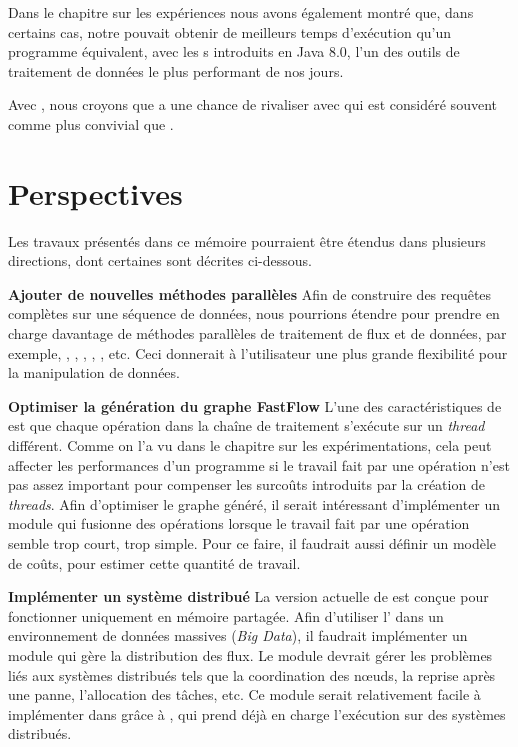 \begin{conclusion}
Dans le chapitre sur les exp\'eriences nous avons \'egalement montr\'e que, dans certains cas, notre  pouvait obtenir de meilleurs temps d'ex\'ecution qu'un programme  \'equivalent, avec les s introduits en Java 8.0, l'un des outils de traitement de donn\'ees le plus performant de nos jours.

Avec , nous croyons que  a une chance de rivaliser avec  qui est consid\'er\'e souvent comme plus convivial que . 


\section*{\textbf{Perspectives}}

Les travaux pr\'esent\'es dans ce m\'emoire pourraient \^etre \'etendus dans plusieurs directions, dont certaines sont d\'ecrites ci-dessous.

\textbf{Ajouter de nouvelles m\'ethodes parall\`eles} Afin de construire des requ\^etes compl\`etes sur une s\'equence de donn\'ees, nous pourrions \'etendre  pour prendre en charge davantage de m\'ethodes parall\`eles de traitement de flux et de donn\'ees, par exemple, , , , , , etc. Ceci donnerait \`a l'utilisateur une plus grande flexibilit\'e pour la manipulation de donn\'ees.

\textbf{Optimiser la génération du graphe FastFlow} L'une des caract\'eristiques de  est que chaque op\'eration dans la cha\^ine de traitement s'ex\'ecute sur un \emph{thread} diff\'erent. Comme on l'a vu dans le chapitre sur les expérimentations, cela peut affecter les performances d'un programme si le travail fait par une op\'eration n'est pas assez important pour compenser les surco\^uts introduits par la cr\'eation de \emph{threads}. Afin d'optimiser le graphe généré, il serait intéressant d'impl\'ementer un module qui fusionne des op\'erations lorsque le travail fait par une op\'eration semble trop court, trop simple. Pour ce faire, il faudrait aussi définir un modèle de coûts, pour estimer cette quantité de travail.

\textbf{Impl\'ementer un syst\`eme distribu\'e} La version actuelle de  est con\c{c}ue pour fonctionner uniquement en m\'emoire partag\'ee. Afin d'utiliser l' dans un environnement de donn\'ees massives (\emph{Big Data}), il faudrait impl\'ementer un module qui g\`ere la distribution des flux. Le module devrait g\'erer les probl\`emes li\'es aux syst\`emes distribu\'es tels que la coordination des nœuds, la reprise apr\`es une panne, l'allocation des t\^aches, etc. Ce module serait relativement facile \`a impl\'ementer dans  gr\^ace \`a , qui prend d\'ej\`a en charge l'ex\'ecution sur des syst\`emes distribu\'es.


\end{conclusion}




